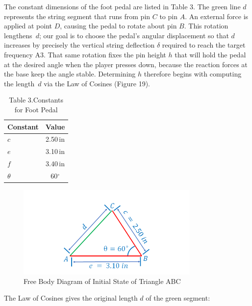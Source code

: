 \documentclass[12pt]{article}
\theoremstyle{definition} %
\theoremstyle{plain} %
\begin{document}
  The constant dimensions of the foot pedal are listed in Table 3.
The green line $d$ represents the string segment that runs from
pin $C$ to pin $A$.
An external force is applied at point $D$, causing the pedal to rotate
about pin $B$.
This rotation lengthens~$d$; our goal is to choose the pedal’s angular
displacement so that $d$ increases by precisely the vertical string
deflection $\delta$ required to reach the target frequency A3.
That same rotation fixes the pin height $h$ that will hold the pedal at
the desired angle when the player presses down, because the reaction
forces at the base keep the angle stable.
Determining $h$ therefore begins with computing the length~$d$ via the
Law of Cosines (Figure 19).

\begin{table}[ht]
\centering
\caption*{Table 3.\;Constants for Foot Pedal}
\begin{tabular}{|l|c|}
\hline
\textbf{Constant} & \textbf{Value} \\ \hline
$c$ & 2.50\,in \\ \hline
$e$ & 3.10\,in \\ \hline
$f$ & 3.40\,in \\ \hline
$\theta$ & 60$^\circ$ \\ \hline
\end{tabular}
\end{table}

\begin{figure}[htbp]
  \centering
  \includegraphics[width=0.8\textwidth]{classes/Mathematics-of-Guitar-Strings/06-10/fgs/fig19.png}
  \caption{Free Body Diagram of Initial State of Triangle ABC}
  \label{fig:}
\end{figure}

The Law of Cosines gives the original length $d$ of the green segment:
\end{document}
